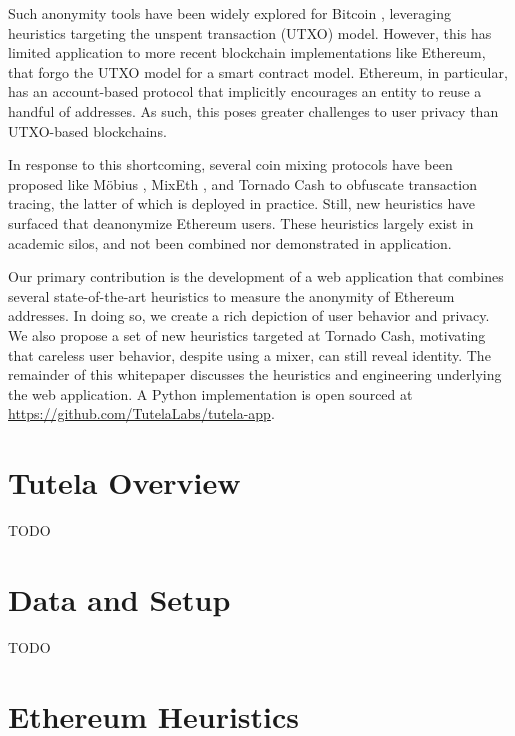 \documentclass[11pt,a4paper]{article}
\begin{document}
Such anonymity tools have been widely explored for Bitcoin \cite{haslhofer2016bitcoin,kappos2018empirical}, leveraging heuristics targeting the unspent transaction (UTXO) model. However, this has limited application to more recent blockchain implementations like Ethereum, that forgo the UTXO model for a smart contract model.
Ethereum, in particular, has an account-based protocol that implicitly encourages an entity to reuse a handful of addresses.
As such, this poses greater challenges to user privacy than UTXO-based blockchains.

In response to this shortcoming, several coin mixing protocols have been proposed like M\"{o}bius \citep{meiklejohn2018mobius}, MixEth \citep{seres2019mixeth}, and Tornado Cash \citep{pertsev2019tornado} to obfuscate transaction tracing, the latter of which is deployed in practice.
Still, new heuristics have surfaced \citep{victor2020address,beres2021blockchain} that deanonymize Ethereum users. These heuristics largely exist in academic silos, and not been combined nor demonstrated in application.

Our primary contribution is the development of a web application that combines several state-of-the-art heuristics to measure the anonymity of Ethereum addresses. In doing so, we create a rich depiction of user behavior and privacy.
We also propose a set of new heuristics targeted at Tornado Cash, motivating that careless user behavior, despite using a mixer, can still reveal identity. The remainder of this whitepaper discusses the heuristics and engineering underlying the web application. A Python implementation is open sourced at \url{https://github.com/TutelaLabs/tutela-app}.

\section{Tutela Overview}

TODO

\section{Data and Setup}

TODO

\section{Ethereum Heuristics}
\end{document}
